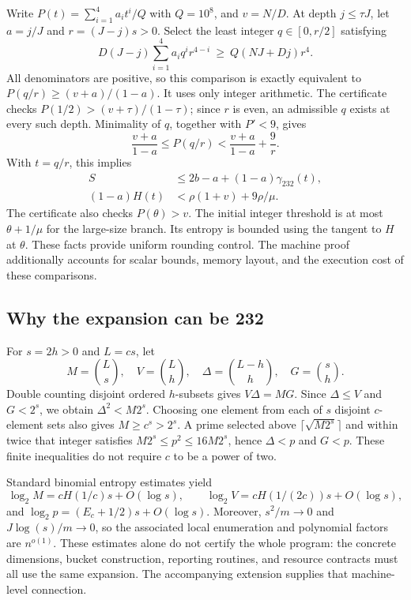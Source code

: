 \documentclass[11pt,a4paper]{article}
\begin{document}
Write $P(t)=\sum_{i=1}^4 a_i t^i/Q$ with $Q=10^8$, and $v=N/D$.
At depth $j\le\tau J$, let $a=j/J$ and $r=(J-j)s>0$. Select the least
integer $q\in[0,r/2]$ satisfying
\begin{equation}\label{eq:integer}
 D(J-j)\sum_{i=1}^4 a_iq^ir^{4-i}\ \ge\ Q(NJ+Dj)r^4.
\end{equation}
All denominators are positive, so this comparison is exactly equivalent to
$P(q/r)\ge(v+a)/(1-a)$. It uses only integer arithmetic. The certificate
checks $P(1/2)>(v+\tau)/(1-\tau)$; since $r$ is even, an admissible $q$
exists at every such depth. Minimality of $q$, together with $P'<9$, gives
\[
 \frac{v+a}{1-a}\le P(q/r)<\frac{v+a}{1-a}+\frac9r.
\]
With $t=q/r$, this implies
\begin{align}
 S&\le2b-a+(1-a)\gamma_{232}(t),\\
 (1-a)H(t)&<\rho(1+v)+9\rho/\mu.
\end{align}
The certificate also checks $P(\theta)>v$. The initial integer threshold
is at most $\theta+1/\mu$ for the large-size branch. Its entropy is bounded
using the tangent to $H$ at $\theta$. These facts provide uniform rounding
control. The machine proof additionally accounts for scalar bounds,
memory layout, and the execution cost of these comparisons.

\subsection{Why the expansion can be 232}
For $s=2h>0$ and $L=cs$, let
\[
 M=\binom Ls,\quad V=\binom Lh,\quad
 \Delta=\binom{L-h}h,\quad G=\binom sh.
\]
Double counting disjoint ordered $h$-subsets gives $V\Delta=MG$.
Since $\Delta\le V$ and $G<2^s$, we obtain $\Delta^2<M2^s$.
Choosing one element from each of $s$ disjoint $c$-element sets also gives
$M\ge c^s>2^s$. A prime selected above
$\lceil\sqrt{M2^s}\rceil$ and within twice that integer satisfies
$M2^s\le p^2\le16M2^s$, hence $\Delta<p$ and $G<p$.
These finite inequalities do not require $c$ to be a power of two.

Standard binomial entropy estimates yield
\[
 \log_2 M=cH(1/c)s+O(\log s),\qquad
 \log_2 V=cH(1/(2c))s+O(\log s),
\]
and $\log_2p=(E_c+1/2)s+O(\log s)$. Moreover, $s^2/m\to0$ and
$J\log(s)/m\to0$, so the associated local enumeration and polynomial
factors are $n^{o(1)}$. These estimates alone do not certify the whole
program: the concrete dimensions, bucket construction, reporting routines,
and resource contracts must all use the same expansion. The accompanying
extension supplies that machine-level connection.
\end{document}
